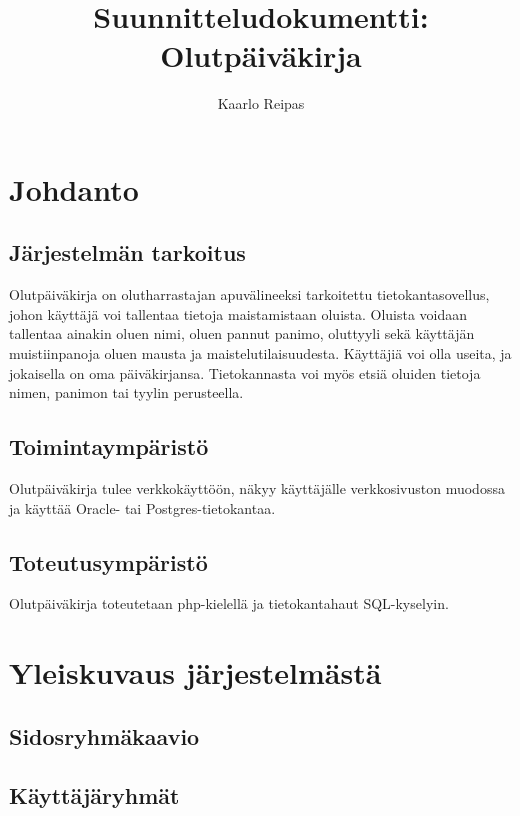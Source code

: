 \documentclass[12pt]{amsart}
\title{Suunnitteludokumentti: Olutpäiväkirja}
\author{Kaarlo Reipas}
\begin{document}
\maketitle

\sloppy

\section{Johdanto}
\label{sec:johdanto}

\subsection{Järjestelmän tarkoitus}

Olutpäiväkirja on olutharrastajan apuvälineeksi tarkoitettu tietokantasovellus, johon käyttäjä voi tallentaa tietoja maistamistaan oluista. Oluista voidaan tallentaa ainakin oluen nimi, oluen pannut panimo, oluttyyli sekä käyttäjän muistiinpanoja oluen mausta ja maistelutilaisuudesta. Käyttäjiä voi olla useita, ja jokaisella on oma päiväkirjansa. Tietokannasta voi myös etsiä oluiden tietoja nimen, panimon tai tyylin perusteella.

\subsection{Toimintaympäristö}

Olutpäiväkirja tulee verkkokäyttöön, näkyy käyttäjälle verkkosivuston muodossa ja käyttää Oracle- tai Postgres-tietokantaa.

\subsection{Toteutusympäristö}

Olutpäiväkirja toteutetaan php-kielellä ja tietokantahaut SQL-kyselyin.

\section{Yleiskuvaus järjestelmästä}

\subsection{Sidosryhmäkaavio}

\subsection{Käyttäjäryhmät}
\end{document}
